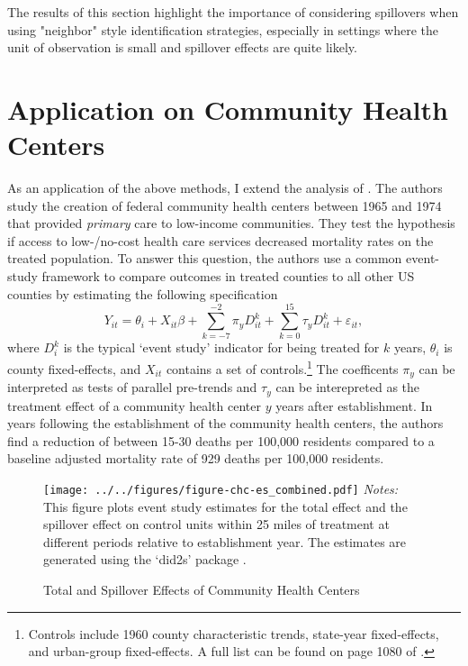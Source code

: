 \documentclass[11pt]{article}
\begin{document}
The results of this section highlight the importance of considering spillovers when using "neighbor" style identification strategies, especially in settings where the unit of observation is small and spillover effects are quite likely. 

\section{Application on Community Health Centers}\label{sec:chc}

As an application of the above methods, I extend the analysis of \citet{Bailey_Goodman_Bacon_2015}. The authors study the creation of federal community health centers between 1965 and 1974 that provided \textit{primary} care to low-income communities. They test the hypothesis if access to low-/no-cost health care services decreased mortality rates on the treated population. To answer this question, the authors use a common event-study framework to compare outcomes in treated counties to all other US counties by estimating the following specification 
\begin{equation}\label{eq:chc_es}
    Y_{it} = \theta_i + X_{it} \beta + \sum_{k = -7}^{-2} \pi_y D_{it}^k + \sum_{k = 0}^{15} \tau_{y} D_{it}^k + \varepsilon_{it},
\end{equation}
where $D_i^k$ is the typical `event study' indicator for being treated for $k$ years, $\theta_i$ is county fixed-effects, and $X_{it}$ contains a set of controls.\footnote{Controls include 1960 county characteristic trends, state-year fixed-effects, and urban-group fixed-effects. A full list can be found on page 1080 of \citet{Bailey_Goodman_Bacon_2015}.} The coefficents $\pi_y$ can be interpreted as tests of parallel pre-trends and $\tau_y$ can be interepreted as the treatment effect of a community health center $y$ years after establishment. In years following the establishment of the community health centers, the authors find a reduction of between 15-30 deaths per 100,000 residents compared to a baseline adjusted mortality rate of 929 deaths per 100,000 residents. 

\begin{figure}[tb!]
    \caption{Total and Spillover Effects of Community Health Centers}
    \label{fig:chc_es_spill}
        
    {\centering
        \texttt{[image: ../../figures/figure-chc-es\_combined.pdf]}
    }
    {\footnotesize
        \textit{Notes:} This figure plots event study estimates for the total effect and the spillover effect on control units within 25 miles of treatment at different periods relative to establishment year. The estimates are generated using the `did2s' package \citep{did2s}. 
    }
\end{figure}
\end{document}

